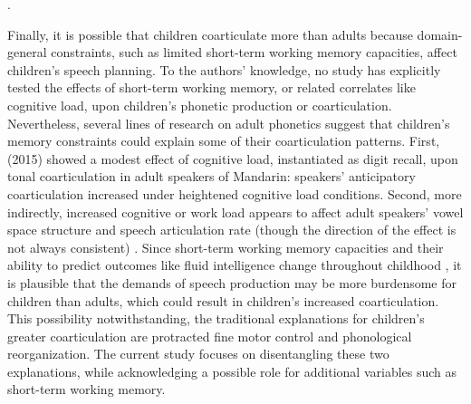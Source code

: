 \documentclass[a4paper,man,natbib,donotrepeattitle, apacite]{apa6}
\begin{document}
\cite{storkelRestructuringSimilarityNeighbourhoods2002}.

Finally, it is possible that children coarticulate more than adults because domain-general constraints, such as limited short-term working memory capacities, affect children's speech planning. To the authors' knowledge, no study has explicitly tested the effects of short-term working memory, or related correlates like cognitive load, upon children's phonetic production or coarticulation. Nevertheless, several lines of research on adult phonetics suggest that children's memory constraints could explain some of their coarticulation patterns. First, \citeauthor{franichEffectCognitiveLoad2015} (2015) showed a modest effect of cognitive load, instantiated as digit recall, upon tonal coarticulation in adult speakers of Mandarin: speakers' anticipatory coarticulation increased under heightened cognitive load conditions. Second, more indirectly, increased cognitive or work load appears to affect adult speakers' vowel space structure and speech articulation rate (though the direction of the effect is not always consistent) \cite{huttunenEffectCognitiveLoad2011,livelyEffectsCognitiveWorkload1993}. Since short-term working memory capacities and their ability to predict outcomes like fluid intelligence change throughout childhood \cite{engeldeabreuWorkingMemoryFluid2010,hitchWorkingMemoryChildren1983}, it is plausible that the demands of speech production may be more burdensome for children than adults, which could result in children's increased coarticulation. This possibility notwithstanding, the traditional explanations for children's greater coarticulation are protracted fine motor control and phonological reorganization. The current study focuses on disentangling these two explanations, while acknowledging a possible role for additional variables such as short-term working memory. 
\end{document}
